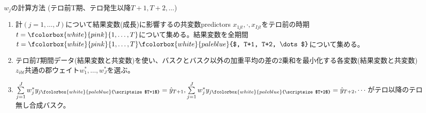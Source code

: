 \begin{frame}{}
$w_{j}$の計算方法 (テロ前T期、テロ発生以降$T+1, T+2, \dots$)
\begin{enumerate}
\vspace{1.0ex}\setlength{\itemsep}{1.0ex}\setlength{\baselineskip}{12pt}
\item	計$(j=1,\dots,J)$について結果変数(成長)に影響するの共変数predictors $x_{1jt}, \cdot, x_{Ijt}$をテロ前の時期$t=\fcolorbox{white}{pink}{1, \dots ,T}$について集める。結果変数を全期間$t=\fcolorbox{white}{pink}{1, \dots , T}\fcolorbox{white}{paleblue}{$, T+1, T+2, \dots$}$について集める。
\pause
\item	テロ前$T$期間データ(結果変数と共変数)を使い、バスクとバスク以外の加重平均の差の2乗和を最小化する各変数(結果変数と共変数)$z_{ibt}$共通の郡ウェイト$w^{*}_{1}, \dots, w^{*}_{J}$を選ぶ。
\pause
\item	$\sum\limits_{j=1}^{J}w^{*}_{j}y_{j\fcolorbox{white}{paleblue}{\scriptsize $T+1$}}=\hat{y}_{T+1}, \sum\limits_{j=1}^{J}w^{*}_{j}y_{j\fcolorbox{white}{paleblue}{\scriptsize $T+2$}}=\hat{y}_{T+2}, \cdots$がテロ以降のテロ無し合成バスク。
\end{enumerate}
\end{frame}

